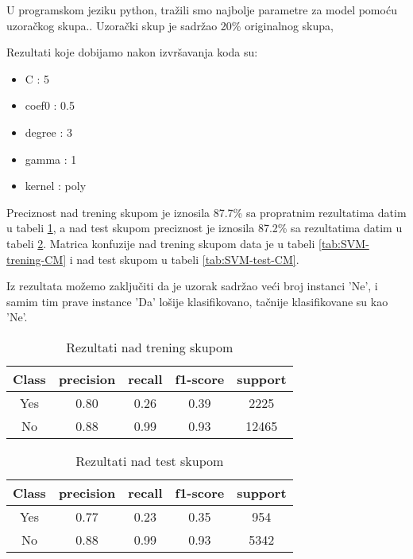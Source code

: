 \documentclass[a4paper]{article}
\begin{document}
U programskom jeziku python, tražili smo najbolje parametre za model pomoću uzoračkog skupa.. Uzorački skup je sadržao 20\% originalnog skupa,

\label{code:SVM}


Rezultati koje dobijamo nakon izvršavanja koda su:
\begin{itemize}
    \item C : 5
    \item coef0 : 0.5
    \item degree : 3
    \item gamma : 1
    \item kernel : poly
\end{itemize}

Preciznost nad trening skupom je iznosila 87.7\% sa propratnim rezultatima datim u tabeli \ref{tab:SVM-py-train}, a nad test skupom preciznost je iznosila 87.2\% sa rezultatima datim u tabeli \ref{tab:SVM-py-test}. Matrica konfuzije nad trening skupom data je u tabeli \ref{tab:SVM-trening-CM} i nad test skupom u tabeli \ref{tab:SVM-test-CM}.\par
Iz rezultata možemo zaključiti da je uzorak sadržao veći broj instanci 'Ne', i samim tim prave instance 'Da' lošije klasifikovano, tačnije klasifikovane su kao 'Ne'.
    \begin{table}[H]
        \begin{center}
        \caption{Rezultati nad trening skupom}
        \label{tab:SVM-py-train}
        \begin{tabular}{|c|c|c|c|c|} \hline
        \textbf{Class} & \textbf{precision} & \textbf{recall}  & \textbf{f1-score} & \textbf{support} \\ \hline
        Yes & 0.80    &  0.26    &  0.39    &  2225 \\ \hline
        No & 0.88  &    0.99    &  0.93 & 12465\\ \hline
        \end{tabular}
        \end{center}
    \end{table}
        
    \begin{table}[H]
        \begin{center}
        \caption{Rezultati nad test skupom}
        \label{tab:SVM-py-test}
        \begin{tabular}{|c|c|c|c|c|} \hline
        \textbf{Class} & \textbf{precision} & \textbf{recall}  & \textbf{f1-score} & \textbf{support} \\ \hline
        Yes &  0.77  &    0.23  &    0.35  &     954 \\ \hline
        No & 0.88  &    0.99  &    0.93  &    5342 \\ \hline
        \end{tabular}
        \end{center}
    \end{table}
    
\end{document}
